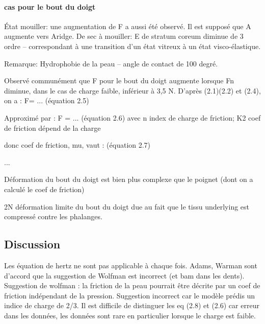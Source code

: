 \paragraph{cas pour le bout du doigt}
 
 État mouiller: une augmentation de F  a aussi été observé. Il est supposé que A augmente vers Aridge. 
 De sec à mouiller: E de stratum coreum diminue de 3 ordre -- correspondant à une transition d'un état vitreux à un état visco-élastique. 
 
Remarque: Hydrophobie de la peau -- angle de contact de 100 degré.

Observé communément que F pour le bout du doigt augmente lorsque Fn diminue, dans le cas de charge faible, inférieur à 3,5 N. D'après (2.1)(2.2) et (2.4), on a : 
F= ... (équation 2.5)

Approximé par :
F = ... (équation 2.6)
avec n index de charge de friction; K2 coef de friction dépend de la charge

donc coef de friction, mu, vaut :
(équation 2.7)

...


Déformation du bout du doigt est bien plus complexe que le poignet (dont on a calculé le coef de friction)
 
2N déformation limite du bout du doigt due au fait que le tissu underlying est compressé contre les phalanges.

\subsection{Discussion}

Les équation de hertz ne sont pas applicable à chaque fois. Adams, Warman sont d'accord que la suggestion de Wolfman est incorrect (et bam dans les dents). Suggestion de wolfman : la friction de la peau pourrait être décrite par un coef de friction indépendant de la pression. Suggestion incorrect car le modèle prédis un indice de charge de 2/3.
Il est difficile de distinguer les eq (2.8) et (2.6) car erreur dans les données, les données sont rare en particulier lorsque le charge est faible. 


